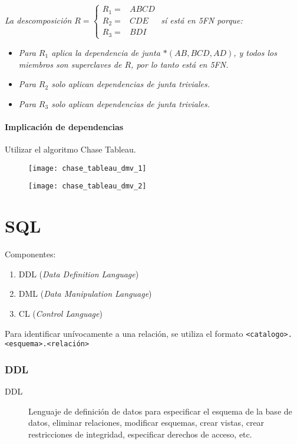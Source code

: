 \documentclass[a4paper, twoside]{article}
\begin{document}
\emph{La descomposición $R = 
\begin{cases}
	R_{1}= & ABCD\\
	R_{2}= & CDE\\
	R_{3}= & BDI
\end{cases}$ sí está en 5FN porque:}
\begin{itemize}
	\item \emph{Para $R_{1}$ aplica la dependencia de junta $*\left(AB,BCD,AD\right)$, y todos los miembros son superclaves de $R$, por lo tanto está en 5FN.}
	\item \emph{Para $R_{2}$ solo aplican dependencias de junta triviales.}
	\item \emph{Para $R_{3}$ solo aplican dependencias de junta triviales.}
\end{itemize}

\subsection{Implicación de dependencias}
Utilizar el algoritmo Chase Tableau.

\begin{figure}[H]
	\centering
	\texttt{[image: chase\_tableau\_dmv\_1]}
\end{figure}

\begin{figure}[H]
	\centering
	\texttt{[image: chase\_tableau\_dmv\_2]}
\end{figure}

\newpage
\part{SQL}
Componentes: 
\begin{enumerate}
	\item DDL (\emph{Data Definition Language})
	\item DML (\emph{Data Manipulation Language})
	\item CL (\emph{Control Language})
\end{enumerate}

Para identificar unívocamente a una relación, se utiliza el formato \texttt{<catalogo>.<esquema>.<relación>}

\section{DDL}
\begin{description}
\item[DDL] Lenguaje de definición de datos para especificar el esquema de la base de datos, eliminar relaciones, modificar esquemas, crear vistas, crear restricciones de integridad, especificar derechos de acceso, etc.
\end{description}
\end{document}
